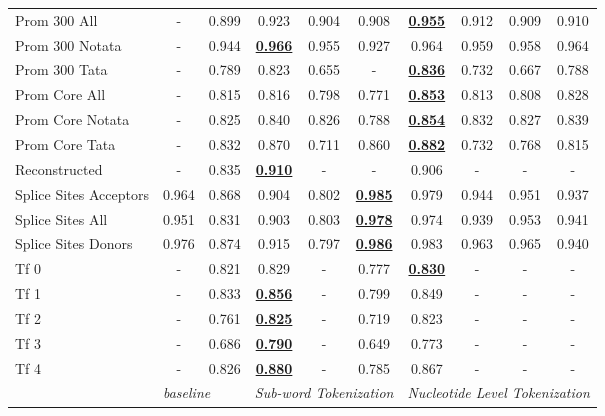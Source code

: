 \begin{table*}[h!]
\begin{center}
\begin{tabular}{l|cc|ccc|cccc}
Prom 300 All & - & 0.899 & 0.923 & 0.904 & 0.908 & {\ul \textbf{0.955}} & 0.912 & 0.909 & 0.910 \\
Prom 300 Notata & - & 0.944 & {\ul \textbf{0.966}} & 0.955 & 0.927 & 0.964 & 0.959 & 0.958 & 0.964 \\
Prom 300 Tata & - & 0.789 & 0.823 & 0.655 & - & {\ul \textbf{0.836}} & 0.732 & 0.667 & 0.788 \\
Prom Core All & - & 0.815 & 0.816 & 0.798 & 0.771 & {\ul \textbf{0.853}} & 0.813 & 0.808 & 0.828 \\
Prom Core Notata & - & 0.825 & 0.840 & 0.826 & 0.788 & {\ul \textbf{0.854}} & 0.832 & 0.827 & 0.839 \\
Prom Core Tata & - & 0.832 & 0.870 & 0.711 & 0.860 & {\ul \textbf{0.882}} & 0.732 & 0.768 & 0.815 \\
Reconstructed & - & 0.835 & {\ul \textbf{0.910}} & - & - & 0.906 & - & - & - \\
Splice Sites Acceptors & 0.964 & 0.868 & 0.904 & 0.802 & {\ul \textbf{0.985}} & 0.979 & 0.944 & 0.951 & 0.937 \\
Splice Sites All & 0.951 & 0.831 & 0.903 & 0.803 & {\ul \textbf{0.978}} & 0.974 & 0.939 & 0.953 & 0.941 \\
Splice Sites Donors & 0.976 & 0.874 & 0.915 & 0.797 & {\ul \textbf{0.986}} & 0.983 & 0.963 & 0.965 & 0.940 \\
Tf 0 & - & 0.821 & 0.829 & - & 0.777 & {\ul \textbf{0.830}} & - & - & - \\
Tf 1 & - & 0.833 & {\ul \textbf{0.856}} & - & 0.799 & 0.849 & - & - & - \\
Tf 2 & - & 0.761 & {\ul \textbf{0.825}} & - & 0.719 & 0.823 & - & - & - \\
Tf 3 & - & 0.686 & {\ul \textbf{0.790}} & - & 0.649 & 0.773 & - & - & - \\
Tf 4 & - & 0.826 & {\ul \textbf{0.880}} & - & 0.785 & 0.867 & - & - & - \\
\hline
 & \multicolumn{2}{l|}{\textit{baseline}} & \multicolumn{3}{c|}{\textit{Sub-word Tokenization}} & \multicolumn{4}{c}{\textit{Nucleotide Level Tokenization}} \\ \hline
\end{tabular}
\end{center}
\end{table*}